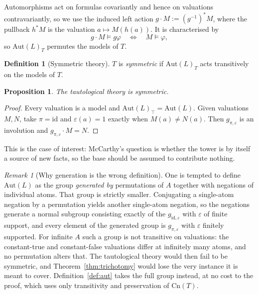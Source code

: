 \documentclass[11pt]{article}
\theoremstyle{plain}
\newtheorem{proposition}[theorem]{Proposition}
\theoremstyle{definition}
\newtheorem{definition}[theorem]{Definition}
\theoremstyle{remark}
\newtheorem{remark}[theorem]{Remark}
\newcommand{\Cn}{\mathrm{Cn}}
\newcommand{\Aut}{\mathrm{Aut}}
\begin{document}
Automorphisms act on formulas covariantly and hence on valuations
contravariantly, so we use the induced left action
$g \cdot M := (g^{-1})^{*}M$, where the pullback $h^{*}M$ is the valuation
$a \mapsto M(h(a))$. It is characterised by
\[
g \cdot M \models g\varphi \quad\Longleftrightarrow\quad M \models \varphi ,
\]
so $\Aut(L)_T$ permutes the models of $T$.

\begin{definition}[Symmetric theory]
$T$ is \emph{symmetric} if $\Aut(L)_T$ acts transitively on the models of $T$.
\end{definition}

\begin{proposition}\label{prop:tautsym}
The tautological theory is symmetric.
\end{proposition}

\begin{proof}
Every valuation is a model and $\Aut(L)_{\top}=\Aut(L)$. Given valuations $M,N$,
take $\pi=\mathrm{id}$ and $\varepsilon(a)=1$ exactly when $M(a)\neq N(a)$. Then
$g_{\pi,\varepsilon}$ is an involution and $g_{\pi,\varepsilon}\cdot M = N$.
\end{proof}

This is the case of interest: McCarthy's question is whether the tower is by
itself a source of new facts, so the base should be assumed to contribute
nothing.

\begin{remark}[Why generation is the wrong definition]\label{rem:finitegen}
One is tempted to define $\Aut(L)$ as the group \emph{generated by} permutations
of $A$ together with negations of individual atoms. That group is strictly
smaller. Conjugating a single-atom negation by a permutation yields another
single-atom negation, so the negations generate a normal subgroup consisting
exactly of the $g_{\mathrm{id},\varepsilon}$ with $\varepsilon$ of finite
support, and every element of the generated group is $g_{\pi,\varepsilon}$ with
$\varepsilon$ finitely supported. For infinite $A$ such a group is not
transitive on valuations: the constant-true and constant-false valuations differ
at infinitely many atoms, and no permutation alters that. The tautological
theory would then fail to be symmetric, and Theorem~\ref{thm:trichotomy} would
lose the very instance it is meant to cover. Definition~\ref{def:aut} takes the
full group instead, at no cost to the proof, which uses only transitivity and
preservation of $\Cn(T)$.
\end{remark}
\end{document}
